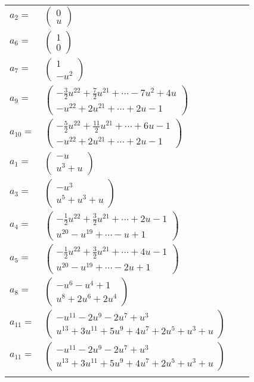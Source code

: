 \documentclass[1p]{elsarticle_modified}
\theoremstyle{definition}
\begin{document}
\begin{tabular}{m{7pt} m{180pt} m{7pt} m{180pt} }
\flushright $a_{2}=$&$\begin{pmatrix}0\\u\end{pmatrix}$ \\
\flushright $a_{6}=$&$\begin{pmatrix}1\\0\end{pmatrix}$ \\
\flushright $a_{7}=$&$\begin{pmatrix}1\\- u^2\end{pmatrix}$ \\
\flushright $a_{9}=$&$\begin{pmatrix}-\frac{3}{2} u^{22}+\frac{7}{2} u^{21}+\cdots-7 u^2+4 u\\- u^{22}+2 u^{21}+\cdots+2 u-1\end{pmatrix}$ \\
\flushright $a_{10}=$&$\begin{pmatrix}-\frac{5}{2} u^{22}+\frac{11}{2} u^{21}+\cdots+6 u-1\\- u^{22}+2 u^{21}+\cdots+2 u-1\end{pmatrix}$ \\
\flushright $a_{1}=$&$\begin{pmatrix}- u\\u^3+u\end{pmatrix}$ \\
\flushright $a_{3}=$&$\begin{pmatrix}- u^3\\u^5+u^3+u\end{pmatrix}$ \\
\flushright $a_{4}=$&$\begin{pmatrix}-\frac{1}{2} u^{22}+\frac{3}{2} u^{21}+\cdots+2 u-1\\u^{20}- u^{19}+\cdots- u+1\end{pmatrix}$ \\
\flushright $a_{5}=$&$\begin{pmatrix}-\frac{1}{2} u^{22}+\frac{3}{2} u^{21}+\cdots+4 u-1\\u^{20}- u^{19}+\cdots-2 u+1\end{pmatrix}$ \\
\flushright $a_{8}=$&$\begin{pmatrix}- u^6- u^4+1\\u^8+2 u^6+2 u^4\end{pmatrix}$ \\
\flushright $a_{11}=$&$\begin{pmatrix}- u^{11}-2 u^9-2 u^7+u^3\\u^{13}+3 u^{11}+5 u^9+4 u^7+2 u^5+u^3+u\end{pmatrix}$\\ \flushright $a_{11}=$&$\begin{pmatrix}- u^{11}-2 u^9-2 u^7+u^3\\u^{13}+3 u^{11}+5 u^9+4 u^7+2 u^5+u^3+u\end{pmatrix}$\\&\end{tabular}
\end{document}

